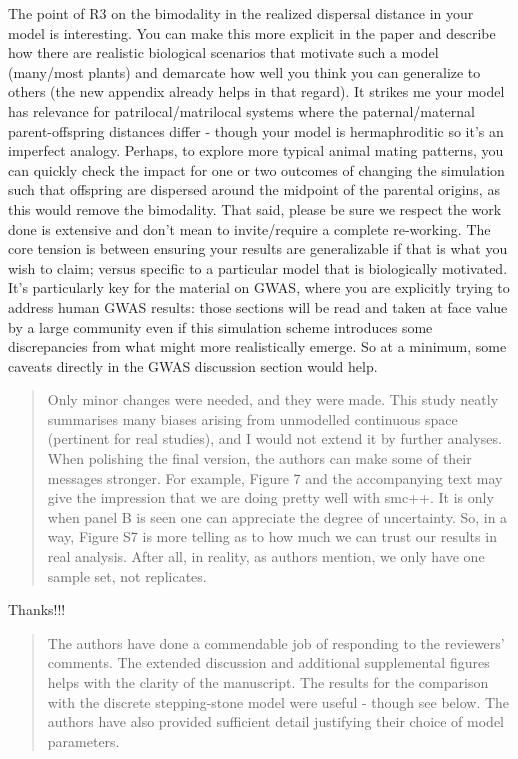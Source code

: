 The point of R3 on the bimodality in the realized dispersal distance in your model is interesting. You can make this more explicit in the paper and describe how there are realistic biological scenarios that motivate such a model (many/most plants) and demarcate how well you think you can generalize to others (the new appendix already helps in that regard). It strikes me your model has relevance for patrilocal/matrilocal systems where the paternal/maternal parent-offspring distances differ - though your model is hermaphroditic so it's an imperfect analogy. Perhaps, to explore more typical animal mating patterns, you can quickly check the impact for one or two outcomes of changing the simulation such that offspring are dispersed around the midpoint of the parental origins, as this would remove the bimodality. That said, please be sure we respect the work done is extensive and don't mean to invite/require a complete re-working. The core tension is between ensuring your results are generalizable if that is what you wish to claim; versus specific to a particular model that is biologically motivated. It's particularly key for the material on GWAS, where you are explicitly trying to address human GWAS results: those sections will be read and taken at face value by a large community even if this simulation scheme introduces some discrepancies from what might more realistically emerge. So at a minimum, some caveats directly in the GWAS discussion section would help.






\begin{quote}
Only minor changes were needed, and they were made. This study neatly summarises many biases arising from unmodelled continuous space (pertinent for real studies), and I would not extend it by further analyses. When polishing the final version, the authors can make some of their messages stronger. For example, Figure 7 and the accompanying text may give the impression that we are doing pretty well with smc++. It is only when panel B is seen one can appreciate the degree of uncertainty. So, in a way, Figure S7 is more telling as to how much we can trust our results in real analysis. After all, in reality, as authors mention, we only have one sample set, not replicates.
\end{quote}

Thanks!!!



\begin{quote}
The authors have done a commendable job of responding to the reviewers' comments. The extended discussion and additional supplemental figures helps with the clarity of the manuscript. The results for the comparison with the discrete stepping-stone model were useful - though see below. The authors have also provided sufficient detail justifying their choice of model parameters.
\end{quote}

